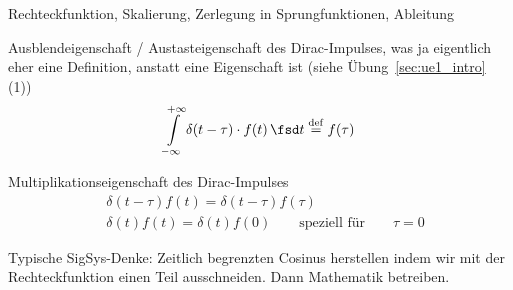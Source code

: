 \begin{Werkzeug}
Rechteckfunktion, Skalierung, Zerlegung in Sprungfunktionen, Ableitung

Ausblendeigenschaft / Austasteigenschaft des Dirac-Impulses,
was ja eigentlich eher eine Definition, anstatt eine Eigenschaft ist (siehe Übung~\ref{sec:ue1_intro} (1))
\begin{equation}
\int\limits_{-\infty}^{+\infty} \delta(t-\tau) \cdot f(t) \, \fsd t \stackrel{\mathrm{def}}= f(\tau)
\end{equation}

Multiplikationseigenschaft des Dirac-Impulses
\begin{align}
&\delta(t-\tau) f(t) = \delta(t-\tau) f(\tau)\\
&\delta(t) f(t) = \delta(t) f(0) \qquad \text{speziell für} \qquad \tau=0
\end{align}

\end{Werkzeug}
\begin{Ansatz}
Typische SigSys-Denke: Zeitlich begrenzten Cosinus herstellen indem wir mit der
Rechteckfunktion einen Teil ausschneiden. Dann Mathematik betreiben.
\end{Ansatz}

